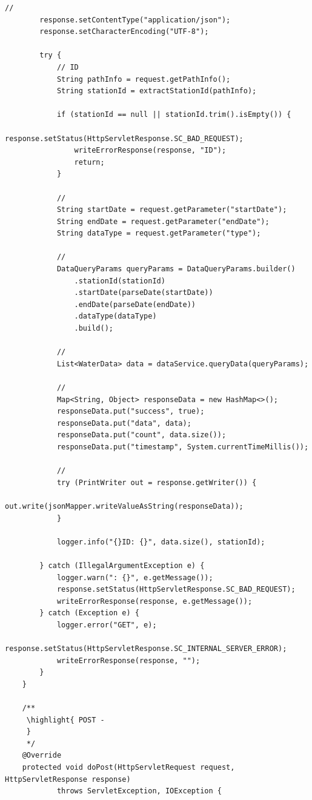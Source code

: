 \begin{lstlisting}[style=java]
        // 
        response.setContentType("application/json");
        response.setCharacterEncoding("UTF-8");
        
        try {
            // ID
            String pathInfo = request.getPathInfo();
            String stationId = extractStationId(pathInfo);
            
            if (stationId == null || stationId.trim().isEmpty()) {
                response.setStatus(HttpServletResponse.SC_BAD_REQUEST);
                writeErrorResponse(response, "ID");
                return;
            }
            
            // 
            String startDate = request.getParameter("startDate");
            String endDate = request.getParameter("endDate");
            String dataType = request.getParameter("type");
            
            // 
            DataQueryParams queryParams = DataQueryParams.builder()
                .stationId(stationId)
                .startDate(parseDate(startDate))
                .endDate(parseDate(endDate))
                .dataType(dataType)
                .build();
            
            // 
            List<WaterData> data = dataService.queryData(queryParams);
            
            // 
            Map<String, Object> responseData = new HashMap<>();
            responseData.put("success", true);
            responseData.put("data", data);
            responseData.put("count", data.size());
            responseData.put("timestamp", System.currentTimeMillis());
            
            // 
            try (PrintWriter out = response.getWriter()) {
                out.write(jsonMapper.writeValueAsString(responseData));
            }
            
            logger.info("{}ID: {}", data.size(), stationId);
            
        } catch (IllegalArgumentException e) {
            logger.warn(": {}", e.getMessage());
            response.setStatus(HttpServletResponse.SC_BAD_REQUEST);
            writeErrorResponse(response, e.getMessage());
        } catch (Exception e) {
            logger.error("GET", e);
            response.setStatus(HttpServletResponse.SC_INTERNAL_SERVER_ERROR);
            writeErrorResponse(response, "");
        }
    }
    
    /**
     \highlight{ POST - 
     } 
     */
    @Override
    protected void doPost(HttpServletRequest request, HttpServletResponse response) 
            throws ServletException, IOException {
        

\end{lstlisting}
